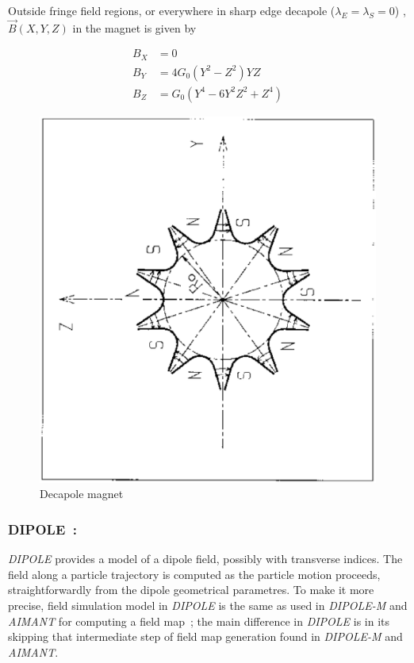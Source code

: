 \noindent Outside fringe field regions, or everywhere in sharp edge decapole 
($ \lambda_ E=\lambda_ S=0$) , $ \vec  B(X,Y,Z) $ in the magnet is given by 

\begin{align*}
	B_X &   =    0 \\
	B_Y &   =   4G_0(Y^2-Z^2)YZ \\
	B_Z &   =    G_0(Y^4-6Y^2Z^2+Z^4)
\end{align*}
\vfill

\begin{figure}[H]
\centerline{\includegraphics[width=12cm,angle=-90]{Fig18.ps}}
\caption{\label{fig18}Decapole magnet}
\end{figure}
\vfill








\newpage

\subsubsection*{DIPOLE~: \DIPOLETitl} \label{DIPOLE} 
\medskip

\noindent\textsl{DIPOLE} provides a model of a dipole field, possibly with transverse indices. 
 The field along a particle trajectory is computed as the 
particle motion proceeds, straightforwardly from the dipole geometrical parametres. 
To make it more precise, field simulation model in \textsl{DIPOLE}  is the same as used in \textsl{DIPOLE-M} and \textsl{AIMANT} 
for computing a field map~; the main difference in \textsl{DIPOLE} is in its skipping that 
intermediate step of field map generation found in \textsl{DIPOLE-M} and \textsl{AIMANT}. 

